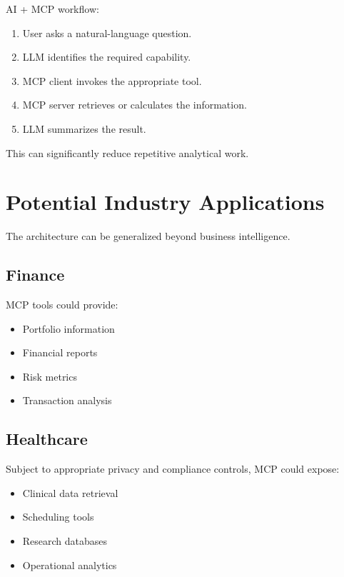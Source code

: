 \documentclass[11pt,a4paper]{article}
\begin{document}
AI + MCP workflow:

\begin{enumerate}
\item User asks a natural-language question.
\item LLM identifies the required capability.
\item MCP client invokes the appropriate tool.
\item MCP server retrieves or calculates the information.
\item LLM summarizes the result.
\end{enumerate}

This can significantly reduce repetitive analytical work.

\section{Potential Industry Applications}

The architecture can be generalized beyond business intelligence.

\subsection{Finance}

MCP tools could provide:

\begin{itemize}
\item Portfolio information
\item Financial reports
\item Risk metrics
\item Transaction analysis
\end{itemize}

\subsection{Healthcare}

Subject to appropriate privacy and compliance controls, MCP could expose:

\begin{itemize}
\item Clinical data retrieval
\item Scheduling tools
\item Research databases
\item Operational analytics
\end{itemize}
\end{document}
